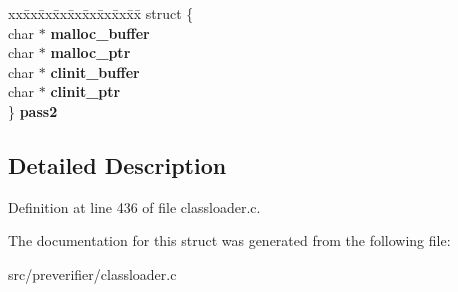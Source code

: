 \begin{DoxyCompactItemize}
\begin{tabbing}
\end{tabbing}\item 
\begin{tabbing}
xx\=xx\=xx\=xx\=xx\=xx\=xx\=xx\=xx\=\kill
struct \{\\
\>char $\ast$ {\bfseries malloc\_buffer}\\
\>char $\ast$ {\bfseries malloc\_ptr}\\
\>char $\ast$ {\bfseries clinit\_buffer}\\
\>char $\ast$ {\bfseries clinit\_ptr}\\
\} {\bfseries pass2}\label{struct_c_i_ccontext_a30afe1eae7e8aa65a4a722622e0fd0d0}
\\

\end{tabbing}\end{DoxyCompactItemize}


\subsection{Detailed Description}


Definition at line 436 of file classloader.c.



The documentation for this struct was generated from the following file:\begin{DoxyCompactItemize}
\item 
src/preverifier/classloader.c\end{DoxyCompactItemize}
